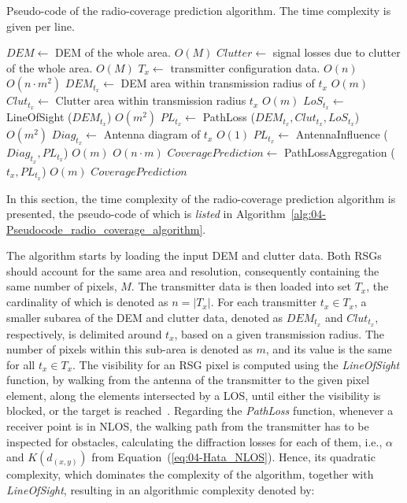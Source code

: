 \begin{algorithm}
\centering

\caption{Pseudo-code of the radio-coverage prediction algorithm. The time complexity
is given per line.\label{alg:04-Pseudocode_radio_coverage_algorithm}}


\begin{algorithmic}
\State $DEM \gets$ DEM of the whole area.
\Comment $O(M)$
\State $Clutter \gets$ signal losses due to clutter of the whole area.
\Comment $O(M)$
\State $T_{x} \gets$ transmitter configuration data.
\Comment $O(n)$
	\Comment $O(n \cdot m^2)$
	\State $DEM_{t_x} \gets $ DEM area within transmission radius of ${t_x}$
	\Comment $O(m)$
	\State $Clut_{t_x} \gets $ Clutter area within transmission radius ${t_x}$
	\Comment $O(m)$
	\State $LoS_{t_x} \gets$ LineOfSight ($DEM_{t_x}$)
	\Comment $O(m^2)$
	\State $PL_{t_x} \gets$ PathLoss ($DEM_{t_x}, Clut_{t_x}, LoS_{t_x}$)
	\Comment $O(m^2)$
	\State $Diag_{t_x} \gets $ Antenna diagram of ${t_x}$ 
	\Comment $O(1)$
	\State $PL_{t_x} \gets$ AntennaInfluence ($Diag_{t_x}, PL_{t_x}$)
	\Comment $O(m)$
\EndFor
{}
	\Comment $O(n \cdot m)$
	\State $CoveragePrediction \gets$ PathLossAggregation ($t_x, PL_{t_x}$)
	\Comment $O(m)$
\EndFor
\State \Return $CoveragePrediction$
\end{algorithmic}
\end{algorithm}


In this section, the time complexity of the radio-coverage prediction
algorithm is presented, the pseudo-code of which is \textit{\emph{listed}}
in Algorithm~\ref{alg:04-Pseudocode_radio_coverage_algorithm}.

The algorithm starts by loading the input DEM and clutter data. Both
RSGs should account for the same area and resolution, consequently
containing the same number of pixels, $M$. The transmitter data is
then loaded into set $T_{x}$, the cardinality of which is denoted
as $n=|T_{x}|$. For each transmitter $t_{x}\in T_{x}$, a smaller
subarea of the DEM and clutter data, denoted as $DEM_{t_{x}}$ and
$Clut_{t_{x}}$, respectively, is delimited around $t_{x}$, based
on a given transmission radius. The number of pixels within this sub-area
is denoted as $m$, and its value is the same for all $t_{x}\in T_{x}$.
The visibility for an RSG pixel is computed using the \emph{LineOfSight}
function, by walking from the antenna of the transmitter to the given
pixel element, along the elements intersected by a LOS, until either
the visibility is blocked, or the target is reached~\cite{DeFloriani-Applications_of_computational_geometry_to_geographic_information_systems:1999}.
Regarding the \emph{PathLoss }function, whenever a receiver point
is in NLOS, the walking path from the transmitter has to be inspected
for obstacles, calculating the diffraction losses for each of them,
i.e., $\alpha$ and $K(d_{(x,y)})$ from Equation~(\ref{eq:04-Hata_NLOS}).
Hence, its quadratic complexity, which dominates the complexity of
the algorithm, together with \emph{LineOfSight}, resulting in an algorithmic
complexity denoted by:

